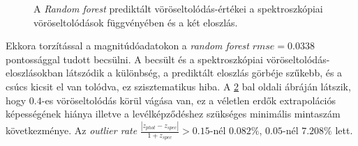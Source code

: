 \documentclass[12pt,letterpaper,twoside,openright]{book}
\begin{document}
\begin{figure}[]
\begin{subfigure}[b]{0.3\textwidth}
    \label{fig:2}
  \end{subfigure}
  \caption{A \textit{Random forest} prediktált vöröseltolódás-értékei a spektroszkópiai vöröseltolódások függvényében és a két eloszlás.}
\label{rfp}
\end{figure}
 Ekkora torzítással a magnitúdóadatokon a \textit{random forest} $rmse = 0.0338$ pontossággal tudott becsülni. A becsült és a spektroszkópiai vöröseltolódás-eloszlásokban látszódik a különbség, a prediktált eloszlás görbéje szűkebb, és a csúcs kicsit el van tolódva, ez szisztematikus hiba. A \ref{rfp} bal oldali ábráján látszik, hogy $0.4$-es vöröseltolódás körül vágása van, ez a véletlen erdők extrapolációs képességének hiánya illetve a levélképződéshez szükséges minimális mintaszám következménye. 
 \newline \indent
Az \textit{outlier rate} $\frac{|z_{phot}-z_{spec}|}{1+z_{spec}} >0.15$-nél $0.082\%$, $0.05$-nél $7.208\%$ lett.
 
\end{document}
